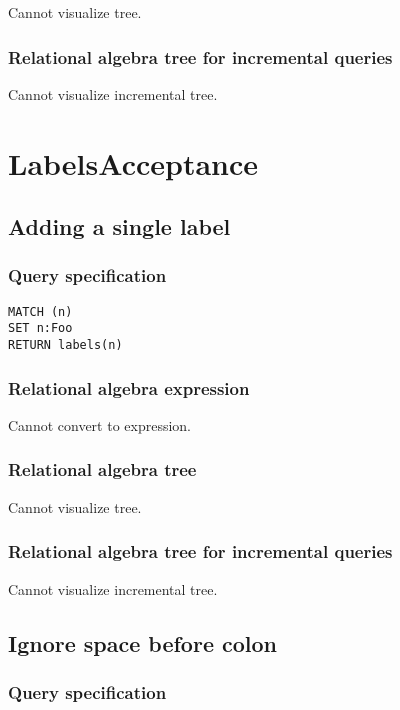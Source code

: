 Cannot visualize tree.

\subsubsection*{Relational algebra tree for incremental queries}

Cannot visualize incremental tree.

\section{LabelsAcceptance}

\subsection{Adding a single label}

\subsubsection*{Query specification}

\begin{lstlisting}
MATCH (n)
SET n:Foo
RETURN labels(n)
\end{lstlisting}

\subsubsection*{Relational algebra expression}

Cannot convert to expression.

\subsubsection*{Relational algebra tree}

Cannot visualize tree.

\subsubsection*{Relational algebra tree for incremental queries}

Cannot visualize incremental tree.

\subsection{Ignore space before colon}

\subsubsection*{Query specification}

